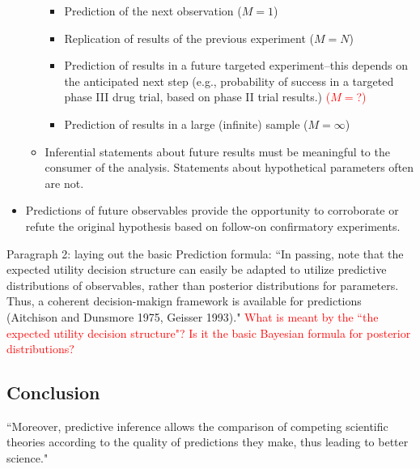 \documentclass[12pt, a4paper]{article}
\begin{document}
\begin{itemize}
\begin{itemize}
    \begin{itemize}
      \item Prediction of the next observation ($M=1$)
      \item Replication of results of the previous experiment ($M=N$)
      \item Prediction of results in a future targeted experiment--this depends on the anticipated next step (e.g., probability of success in a targeted phase III drug trial, based on phase II trial results.) \textcolor{red}{($M=$?)}
      \item Prediction of results in a large (infinite) sample ($M=\infty$)
    \end{itemize}
      \item Inferential statements about future results must be meaningful to the consumer of the analysis.  Statements about hypothetical parameters often are not.
  \end{itemize}
  \item Predictions of future observables provide the opportunity to corroborate or refute the original hypothesis based on follow-on confirmatory experiments.
\end{itemize}

Paragraph 2:  laying out the basic Prediction formula:  ``In passing, note that the expected utility decision structure can easily be adapted to utilize predictive distributions of observables, rather than posterior distributions for parameters.  Thus, a coherent decision-makign framework is available for predictions (Aitchison and Dunsmore 1975, Geisser 1993)." \textcolor{red}{What is meant by the ``the expected utility decision structure"?  Is it the basic Bayesian formula for posterior distributions?}

\subsection{Conclusion}

``Moreover, predictive inference allows the comparison of competing scientific theories according to the quality of predictions they make, thus leading to better science."
\end{document}
